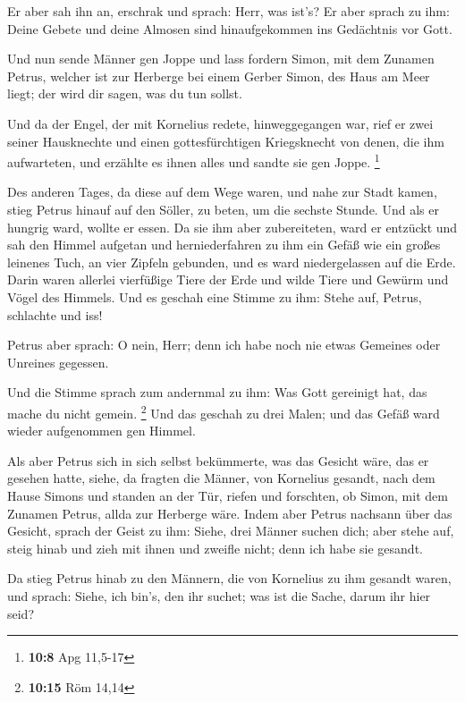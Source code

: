  Er aber sah ihn an, erschrak und sprach: Herr, was ist's?
Er aber sprach zu ihm: Deine Gebete und deine Almosen sind
hinaufgekommen ins Gedächtnis vor Gott.

 Und nun sende Männer gen Joppe und lass fordern Simon, mit
dem Zunamen Petrus,  welcher ist zur Herberge bei einem
Gerber Simon, des Haus am Meer liegt; der wird dir sagen, was du tun
sollst.

 Und da der Engel, der mit Kornelius redete, hinweggegangen
war, rief er zwei seiner Hausknechte und einen gottesfürchtigen
Kriegsknecht von denen, die ihm aufwarteten,  und erzählte
es ihnen alles und sandte sie gen Joppe. \footnote{\textbf{10:8} Apg
  11,5-17}

 Des anderen Tages, da diese auf dem Wege waren, und nahe
zur Stadt kamen, stieg Petrus hinauf auf den Söller, zu beten, um die
sechste Stunde.  Und als er hungrig ward, wollte er essen.
Da sie ihm aber zubereiteten, ward er entzückt  und sah den
Himmel aufgetan und herniederfahren zu ihm ein Gefäß wie ein großes
leinenes Tuch, an vier Zipfeln gebunden, und es ward niedergelassen auf
die Erde.  Darin waren allerlei vierfüßige Tiere der Erde
und wilde Tiere und Gewürm und Vögel des Himmels.  Und es
geschah eine Stimme zu ihm: Stehe auf, Petrus, schlachte und iss!

 Petrus aber sprach: O nein, Herr; denn ich habe noch nie
etwas Gemeines oder Unreines gegessen.

 Und die Stimme sprach zum andernmal zu ihm: Was Gott
gereinigt hat, das mache du nicht gemein. \footnote{\textbf{10:15} Röm
  14,14}  Und das geschah zu drei Malen; und das Gefäß ward
wieder aufgenommen gen Himmel.

 Als aber Petrus sich in sich selbst bekümmerte, was das
Gesicht wäre, das er gesehen hatte, siehe, da fragten die Männer, von
Kornelius gesandt, nach dem Hause Simons und standen an der Tür,
 riefen und forschten, ob Simon, mit dem Zunamen Petrus,
allda zur Herberge wäre.  Indem aber Petrus nachsann über
das Gesicht, sprach der Geist zu ihm: Siehe, drei Männer suchen dich;
 aber stehe auf, steig hinab und zieh mit ihnen und zweifle
nicht; denn ich habe sie gesandt.

 Da stieg Petrus hinab zu den Männern, die von Kornelius zu
ihm gesandt waren, und sprach: Siehe, ich bin's, den ihr suchet; was ist
die Sache, darum ihr hier seid?


